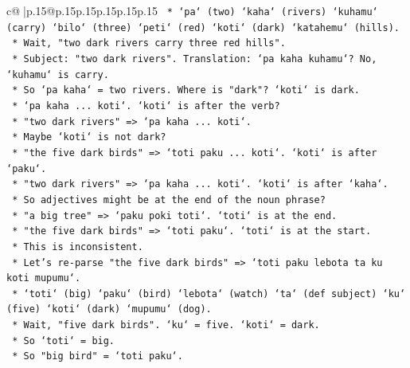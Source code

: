 \documentclass{article}
\begin{document}
{\begin{supertabular}{c@{$\;$}|p{.15\linewidth}@{}p{.15\linewidth}p{.15\linewidth}p{.15\linewidth}p{.15\linewidth}p{.15\linewidth}}
{{{\texttt{                                    *   `pa` (two) `kaha` (rivers) `kuhamu` (carry) `bilo` (three) `peti` (red) `koti` (dark) `katahemu` (hills).} \\
\texttt{                                    *   Wait, "two dark rivers carry three red hills".} \\
\texttt{                                    *   Subject: "two dark rivers". Translation: `pa kaha kuhamu`? No, `kuhamu` is carry.} \\
\texttt{                                    *   So `pa kaha` = two rivers. Where is "dark"? `koti` is dark.} \\
\texttt{                                    *   `pa kaha ... koti`. `koti` is after the verb?} \\
\texttt{                                    *   "two dark rivers" => `pa kaha ... koti`.} \\
\texttt{                                    *   Maybe `koti` is not dark?} \\
\texttt{                                    *   "the five dark birds" => `toti paku ... koti`. `koti` is after `paku`.} \\
\texttt{                                    *   "two dark rivers" => `pa kaha ... koti`. `koti` is after `kaha`.} \\
\texttt{                                    *   So adjectives might be at the end of the noun phrase?} \\
\texttt{                                    *   "a big tree" => `paku poki toti`. `toti` is at the end.} \\
\texttt{                                    *   "the five dark birds" => `toti paku`. `toti` is at the start.} \\
\texttt{                                    *   This is inconsistent.} \\
\texttt{                                    *   Let's re{-}parse "the five dark birds" => `toti paku lebota ta ku koti mupumu`.} \\
\texttt{                                        *   `toti` (big) `paku` (bird) `lebota` (watch) `ta` (def subject) `ku` (five) `koti` (dark) `mupumu` (dog).} \\
\texttt{                                        *   Wait, "five dark birds". `ku` = five. `koti` = dark.} \\
\texttt{                                        *   So `toti` = big.} \\
\texttt{                                        *   So "big bird" = `toti paku`.} \\
}}}
\end{supertabular}}
\end{document}
